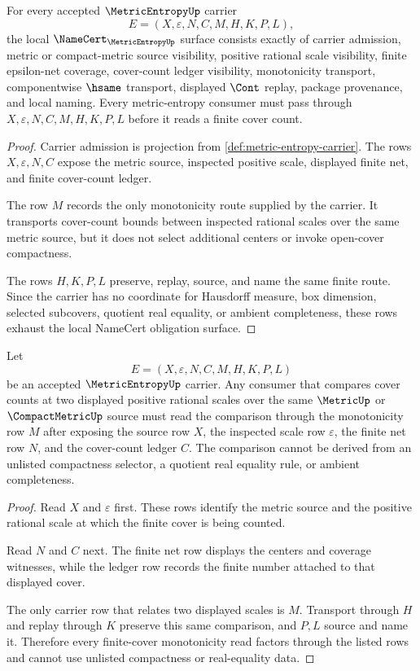 \begin{theorem}
\label{thm:metric-entropy-namecert-obligations}
For every accepted $\MetricEntropyUp$ carrier
$$
E=(X,\varepsilon,N,C,M,H,K,P,L),
$$
the local $\NameCert_{\MetricEntropyUp}$ surface consists exactly of carrier admission, metric or compact-metric source visibility, positive rational scale visibility, finite epsilon-net coverage, cover-count ledger visibility, monotonicity transport, componentwise $\hsame$ transport, displayed $\Cont$ replay, package provenance, and local naming. Every metric-entropy consumer must pass through $X,\varepsilon,N,C,M,H,K,P,L$ before it reads a finite cover count.
\end{theorem}
\begin{proof}
Carrier admission is projection from \autoref{def:metric-entropy-carrier}. The rows $X,\varepsilon,N,C$ expose the metric source, inspected positive scale, displayed finite net, and finite cover-count ledger.

The row $M$ records the only monotonicity route supplied by the carrier. It transports cover-count bounds between inspected rational scales over the same metric source, but it does not select additional centers or invoke open-cover compactness.

The rows $H,K,P,L$ preserve, replay, source, and name the same finite route. Since the carrier has no coordinate for Hausdorff measure, box dimension, selected subcovers, quotient real equality, or ambient completeness, these rows exhaust the local NameCert obligation surface.
\end{proof}

\begin{theorem}
\label{thm:metric-entropy-finite-cover-monotonicity}
Let
$$
E=(X,\varepsilon,N,C,M,H,K,P,L)
$$
be an accepted $\MetricEntropyUp$ carrier. Any consumer that compares cover counts at two displayed positive rational scales over the same $\MetricUp$ or $\CompactMetricUp$ source must read the comparison through the monotonicity row $M$ after exposing the source row $X$, the inspected scale row $\varepsilon$, the finite net row $N$, and the cover-count ledger $C$. The comparison cannot be derived from an unlisted compactness selector, a quotient real equality rule, or ambient completeness.
\end{theorem}
\begin{proof}
Read $X$ and $\varepsilon$ first. These rows identify the metric source and the positive rational scale at which the finite cover is being counted.

Read $N$ and $C$ next. The finite net row displays the centers and coverage witnesses, while the ledger row records the finite number attached to that displayed cover.

The only carrier row that relates two displayed scales is $M$. Transport through $H$ and replay through $K$ preserve this same comparison, and $P,L$ source and name it. Therefore every finite-cover monotonicity read factors through the listed rows and cannot use unlisted compactness or real-equality data.
\end{proof}

